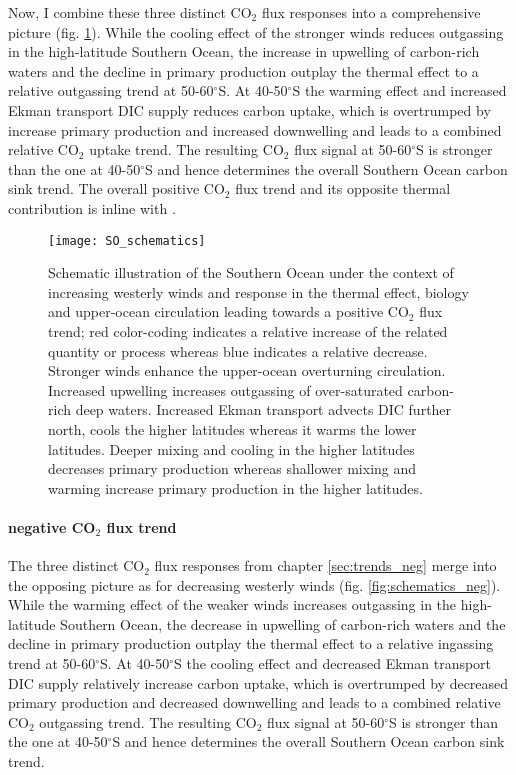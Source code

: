 \documentclass[12pt]{article}
\begin{document}
Now, I combine these three distinct CO$_2$ flux responses into a comprehensive picture (fig. \ref{fig:schematics_pos}). 
While the cooling effect of the stronger winds reduces outgassing in the high-latitude Southern Ocean, the increase in upwelling of carbon-rich waters and the decline in primary production outplay the thermal effect to a relative outgassing trend at 50-60$^\circ$S. At 40-50$^\circ$S the warming effect and  increased Ekman transport DIC supply reduces carbon uptake, which is overtrumped by increase primary production and increased downwelling and leads to a combined relative CO$_2$ uptake trend. The resulting CO$_2$ flux signal at 50-60$^\circ$S is stronger than the one at 40-50$^\circ$S and hence determines the overall Southern Ocean carbon sink trend. The overall positive CO$_2$ flux trend and its opposite thermal contribution is inline with \cite{Lovenduski2007}.


\begin{figure}[h!]
	\centering
	\texttt{[image: SO\_schematics]}
	\caption{Schematic illustration of the Southern Ocean under the context of increasing westerly winds and response in the thermal effect, biology and upper-ocean circulation leading towards a positive CO$_2$ flux trend; red color-coding indicates a relative increase of the related quantity or process whereas blue indicates a relative decrease. Stronger winds enhance the upper-ocean overturning circulation. Increased upwelling increases outgassing of over-saturated carbon-rich deep waters. Increased Ekman transport advects DIC further north, cools the higher latitudes whereas it warms the lower latitudes. Deeper mixing and cooling in the higher latitudes decreases primary production whereas shallower mixing and warming increase primary production in the higher latitudes.}
	\label{fig:schematics_pos}
\end{figure}



\paragraph{negative CO$_2$ flux trend}
\label{sec:pCO2separation_neg}
The three distinct CO$_2$ flux responses from chapter \ref{sec:trends_neg} merge into the opposing picture as for decreasing westerly winds (fig. \ref{fig:schematics_neg}). 
While the warming effect of the weaker winds increases outgassing in the high-latitude Southern Ocean, the decrease in upwelling of carbon-rich waters and the decline in primary production outplay the thermal effect to a relative ingassing trend at 50-60$^\circ$S. At 40-50$^\circ$S the cooling effect and decreased Ekman transport DIC supply relatively increase carbon uptake, which is overtrumped by decreased primary production and decreased downwelling and leads to a combined relative CO$_2$ outgassing trend. The resulting CO$_2$ flux signal at 50-60$^\circ$S is stronger than the one at 40-50$^\circ$S and hence determines the overall Southern Ocean carbon sink trend.
\end{document}
